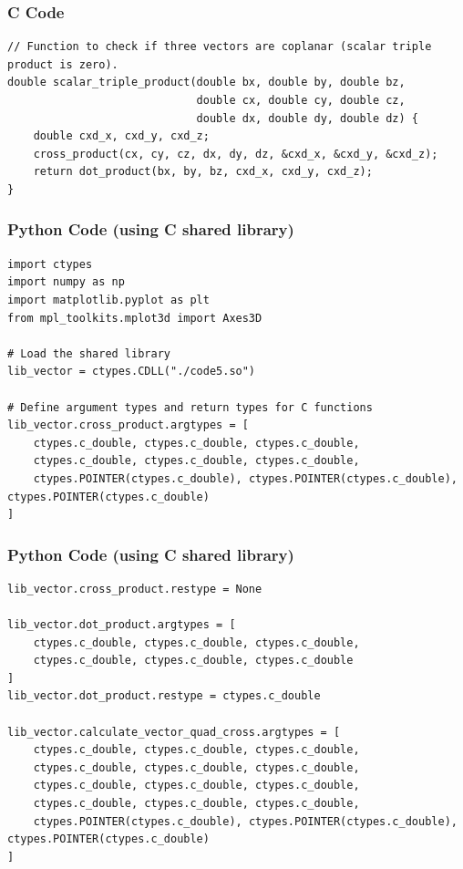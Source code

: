\documentclass{beamer}
\begin{document}
\begin{frame}[fragile]
\frametitle{C Code}
\begin{lstlisting}
// Function to check if three vectors are coplanar (scalar triple product is zero).
double scalar_triple_product(double bx, double by, double bz,
                             double cx, double cy, double cz,
                             double dx, double dy, double dz) {
    double cxd_x, cxd_y, cxd_z;
    cross_product(cx, cy, cz, dx, dy, dz, &cxd_x, &cxd_y, &cxd_z);
    return dot_product(bx, by, bz, cxd_x, cxd_y, cxd_z);
}
\end{lstlisting}
\end{frame}

\begin{frame}[fragile]
\frametitle{Python Code (using C shared library)}
\begin{lstlisting}
import ctypes
import numpy as np
import matplotlib.pyplot as plt
from mpl_toolkits.mplot3d import Axes3D

# Load the shared library
lib_vector = ctypes.CDLL("./code5.so")

# Define argument types and return types for C functions
lib_vector.cross_product.argtypes = [
    ctypes.c_double, ctypes.c_double, ctypes.c_double,
    ctypes.c_double, ctypes.c_double, ctypes.c_double,
    ctypes.POINTER(ctypes.c_double), ctypes.POINTER(ctypes.c_double), ctypes.POINTER(ctypes.c_double)
]
\end{lstlisting}
\end{frame}

\begin{frame}[fragile]
\frametitle{Python Code (using C shared library)}
\begin{lstlisting}
lib_vector.cross_product.restype = None

lib_vector.dot_product.argtypes = [
    ctypes.c_double, ctypes.c_double, ctypes.c_double,
    ctypes.c_double, ctypes.c_double, ctypes.c_double
]
lib_vector.dot_product.restype = ctypes.c_double

lib_vector.calculate_vector_quad_cross.argtypes = [
    ctypes.c_double, ctypes.c_double, ctypes.c_double,
    ctypes.c_double, ctypes.c_double, ctypes.c_double,
    ctypes.c_double, ctypes.c_double, ctypes.c_double,
    ctypes.c_double, ctypes.c_double, ctypes.c_double,
    ctypes.POINTER(ctypes.c_double), ctypes.POINTER(ctypes.c_double), ctypes.POINTER(ctypes.c_double)
]
\end{lstlisting}
\end{frame}
\end{document}
